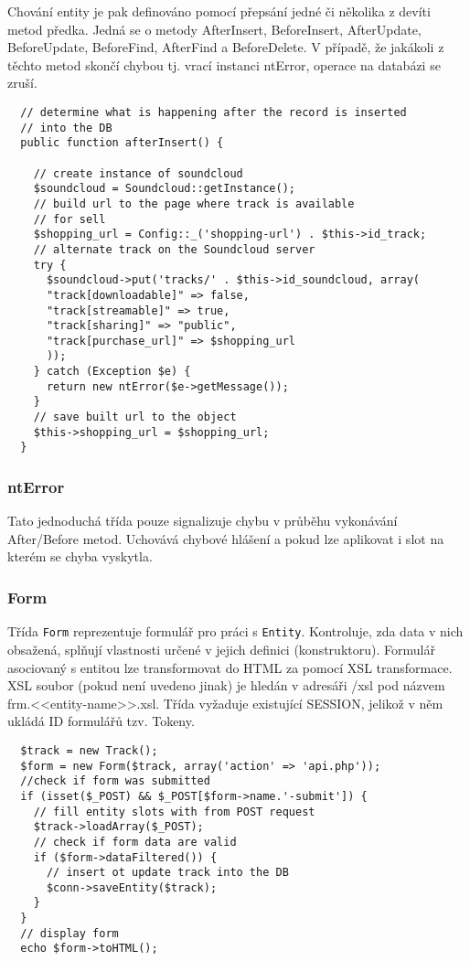 \documentclass[12pt]{article}
\begin{document}
Chování entity je pak definováno pomocí přepsání jedné či několika z devíti metod předka.
Jedná se o metody AfterInsert, BeforeInsert, AfterUpdate, BeforeUpdate, BeforeFind, AfterFind a BeforeDelete.
V případě, že jakákoli z těchto metod skončí chybou tj. vrací instanci ntError, operace na databázi se zruší.
\begin{lstlisting}
  // determine what is happening after the record is inserted
  // into the DB
  public function afterInsert() {

    // create instance of soundcloud
    $soundcloud = Soundcloud::getInstance();
    // build url to the page where track is available
    // for sell
    $shopping_url = Config::_('shopping-url') . $this->id_track;
    // alternate track on the Soundcloud server
    try {
      $soundcloud->put('tracks/' . $this->id_soundcloud, array(
      "track[downloadable]" => false,
      "track[streamable]" => true,
      "track[sharing]" => "public",
      "track[purchase_url]" => $shopping_url
      ));
    } catch (Exception $e) {
      return new ntError($e->getMessage());
    }
    // save built url to the object
    $this->shopping_url = $shopping_url;
  }
\end{lstlisting}

\subsubsection{ntError}
Tato jednoduchá třída pouze signalizuje chybu v průběhu vykonávání After/Before metod. Uchovává chybové hlášení a pokud lze aplikovat i slot na kterém se chyba vyskytla.

\subsubsection{Form}
Třída \verb|Form| reprezentuje formulář pro práci s \verb|Entity|. Kontroluje, zda data v nich obsažená, splňují vlastnosti určené v jejich definici (konstruktoru). Formulář asociovaný s entitou lze transformovat do HTML za pomocí XSL transformace. XSL soubor (pokud není uvedeno jinak) je hledán v adresáři /xsl pod názvem frm.<<entity-name>>.xsl. Třída vyžaduje existující SESSION, jelikož v něm ukládá ID formulářů tzv. Tokeny.

\begin{lstlisting}
  $track = new Track();
  $form = new Form($track, array('action' => 'api.php'));
  //check if form was submitted
  if (isset($_POST) && $_POST[$form->name.'-submit']) {
    // fill entity slots with from POST request
    $track->loadArray($_POST);
    // check if form data are valid
    if ($form->dataFiltered()) {
      // insert ot update track into the DB
      $conn->saveEntity($track);
    }
  }
  // display form
  echo $form->toHTML();
\end{lstlisting}
\end{document}
